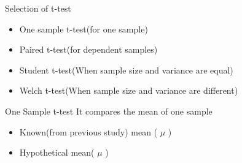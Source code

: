 \begin{frame}[t]{Selection of t-test}
	\begin{itemize}
		\item One sample t-test(for one sample)
		\item Paired t-test(for dependent samples)
		\item Student t-test(When sample size and variance are equal)
		\item Welch t-test(When sample size and variance are different)
	\end{itemize}
\end{frame}
\begin{frame}[t]{One Sample t-test}
	It compares the mean of one sample \\
	\begin{itemize}
		\item Known(from previous study) mean ( $\mu$ )
		\item Hypothetical mean( $\mu$ )
	\end{itemize}
\end{frame}

